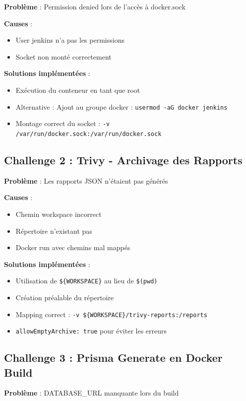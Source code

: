 \documentclass[12pt,a4paper]{report}
\begin{document}
\textbf{Problème} : Permission denied lors de l'accès à docker.sock

\textbf{Causes} :
\begin{itemize}
    \item User jenkins n'a pas les permissions
    \item Socket non monté correctement
\end{itemize}

\textbf{Solutions implémentées} :
\begin{itemize}
    \item Exécution du conteneur en tant que root
    \item Alternative : Ajout au groupe docker : \verb|usermod -aG docker jenkins|
    \item Montage correct du socket : \verb|-v /var/run/docker.sock:/var/run/docker.sock|
\end{itemize}

\subsection{Challenge 2 : Trivy - Archivage des Rapports}

\textbf{Problème} : Les rapports JSON n'étaient pas générés

\textbf{Causes} :
\begin{itemize}
    \item Chemin workspace incorrect
    \item Répertoire n'existant pas
    \item Docker run avec chemins mal mappés
\end{itemize}

\textbf{Solutions implémentées} :
\begin{itemize}
    \item Utilisation de \verb|${WORKSPACE}| au lieu de \verb|$(pwd)|
    \item Création préalable du répertoire
    \item Mapping correct : \verb|-v ${WORKSPACE}/trivy-reports:/reports|
    \item \verb|allowEmptyArchive: true| pour éviter les erreurs
\end{itemize}

\subsection{Challenge 3 : Prisma Generate en Docker Build}

\textbf{Problème} : DATABASE_URL manquante lors du build
\end{document}
